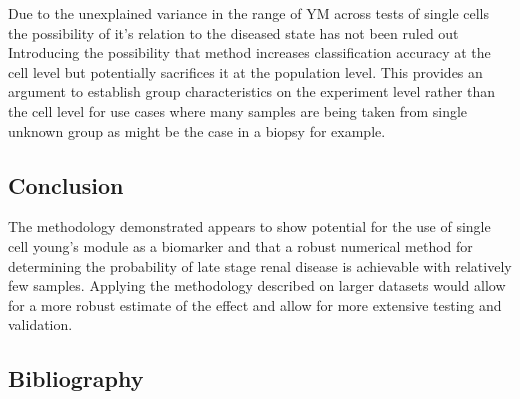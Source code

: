 \documentclass[
  paper=a4,
  ,captions=tableheading
]{scrartcl}
\begin{document}
Due to the unexplained variance in the range of YM across tests of
single cells the possibility of it's relation to the diseased state has
not been ruled out Introducing the possibility that method increases
classification accuracy at the cell level but potentially sacrifices it
at the population level. This provides an argument to establish group
characteristics on the experiment level rather than the cell level for
use cases where many samples are being taken from single unknown group
as might be the case in a biopsy for example.

\subsection{Conclusion}\label{conclusion}
The methodology demonstrated appears to show potential for the use of single cell young's module as a biomarker and that a robust numerical method for determining the probability of late stage renal disease is achievable with relatively few samples.  Applying the methodology described on larger datasets would allow for a more robust estimate of the effect and allow for more extensive testing and validation.
\subsection*{Bibliography}\label{bibliography}
\end{document}

